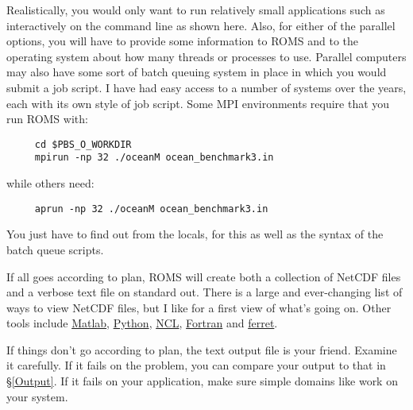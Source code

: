 Realistically, you would only want to run relatively small
applications such as  interactively on the command
line as shown here. Also, for either of the parallel options, you
will have to provide some information to ROMS and to the operating
system about how many threads or processes to use. Parallel
computers may also have some sort of batch queuing system in place
in which you would submit a job script. I have had easy access to a
number of systems over the years, each with its own style of job
script. Some MPI environments require that you run ROMS with:
\begin{verbatim}
     cd $PBS_O_WORKDIR
     mpirun -np 32 ./oceanM ocean_benchmark3.in
\end{verbatim}
while others need:
\begin{verbatim}
     aprun -np 32 ./oceanM ocean_benchmark3.in
\end{verbatim}
You just have to find out from the locals, for this as well as the syntax
of the batch queue scripts.

If all goes according to plan, ROMS will create both a collection
of NetCDF files and a verbose text file on standard out. There is a
large and ever-changing list of ways to view NetCDF files, but I like
\href{http://meteora.ucsd.edu/\~pierce/ncview\_home\_page.html}{}
for a first view of what's going on.
Other tools include
\href{http://www.mathworks.com/products/matlab/}{Matlab},
\href{http://www.python.org/}{Python},
\href{http://www.ncl.ucar.edu/}{NCL},
\href{https://www.myroms.org/wiki/index.php/Plotting_Package_Installation}{Fortran}
and \href{http://www.ferret.noaa.gov/Ferret/}{ferret}.

If things don't go according to plan, the text output file is your
friend. Examine it carefully. If it fails on the 
problem, you can compare your output to that in \S\ref{Output}. If it
fails on your application, make sure simple domains like 
work on your system.

